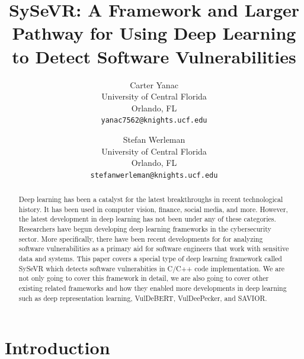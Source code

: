 \documentclass[12pt,twocolumn,letterpaper]{article}
\begin{document}
\title{SySeVR: A Framework and Larger Pathway for Using Deep Learning to Detect Software Vulnerabilities}

\author{
    Carter Yanac\\
    University of Central Florida\\
    Orlando, FL\\
    {\tt\small yanac7562@knights.ucf.edu}
    \and
    Stefan Werleman\\
    University of Central Florida\\
    Orlando, FL\\
    {\tt\small stefanwerleman@knights.ucf.edu}
}
\maketitle

\begin{abstract}
    Deep learning has been a catalyst for the latest breakthroughs in recent technological history. It has been 
    used in computer vision, finance, social media, and more. However, the latest development in deep 
    learning has not been under any of these categories. Researchers have begun developing deep learning 
    frameworks in the cybersecurity sector. More specifically, there have been recent developments for 
    for analyzing software vulnerabilities as a primary aid for software engineers that work with sensitive 
    data and systems. This paper covers a special type of deep learning framework called SySeVR which 
    detects software vulnerabities in C/C++ code implementation. We are not only going to cover this framework in detail,
    we are also going to cover other existing related frameworks and how they enabled more 
    developments in deep learning such as deep representation learning, VulDeBERT, VulDeePecker, and SAVIOR.
\end{abstract}

\section{Introduction}
\label{sec:intro}
\end{document}
